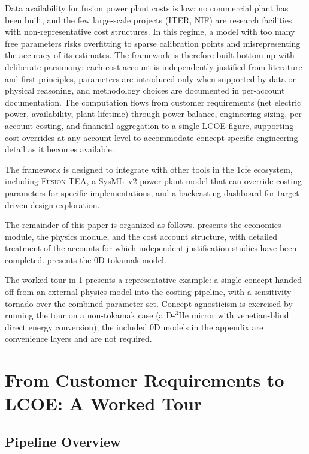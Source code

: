 \documentclass{article}
\begin{document}
Data availability for fusion power plant costs is low: no commercial plant
has been built, and the few large-scale projects (ITER, NIF) are research
facilities with non-representative cost structures. In this regime, a model
with too many free parameters risks overfitting to sparse calibration points
and misrepresenting the accuracy of its estimates. The framework is therefore
built bottom-up with deliberate parsimony: each cost account is independently
justified from literature and first principles, parameters are introduced
only when supported by data or physical reasoning, and methodology choices
are documented in per-account documentation.
The computation flows from customer requirements (net electric
power, availability, plant lifetime) through power balance, engineering
sizing, per-account costing, and financial aggregation to a single LCOE
figure, supporting cost overrides at any account level to accommodate
concept-specific engineering detail as it becomes available.

The framework is designed to integrate with other tools in the 1cfe ecosystem,
including \textsc{Fusion-TEA}, a SysML~v2 power plant model that can override
costing parameters for specific implementations, and a backcasting dashboard
for target-driven design exploration.

The remainder of this paper is organized as follows.
 presents the economics module,
 the physics module, and
 the cost account structure, with detailed treatment of
the accounts for which independent justification studies have been completed.
 presents the 0D tokamak model.

The worked tour in \cref{sec:tour} presents a representative
example: a single concept handed off from an external physics model
into the costing pipeline, with a sensitivity tornado over the
combined parameter set. Concept-agnosticism is exercised by running
the tour on a non-tokamak case (a D-${}^3$He mirror with
venetian-blind direct energy conversion); the included 0D models in
the appendix are convenience layers and are not required.


\section{From Customer Requirements to LCOE: A Worked Tour}
\label{sec:tour}

\subsection{Pipeline Overview}
\label{sec:tour-pipeline}
\end{document}
